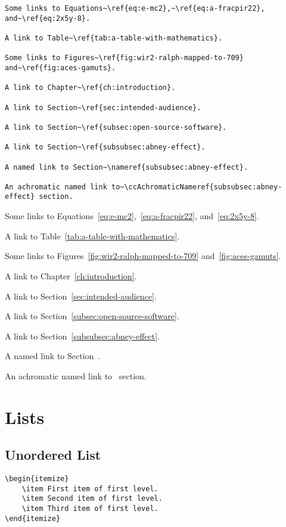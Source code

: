 \begin{lstlisting}[caption={Hyperlinks.}]
Some links to Equations~\ref{eq:e-mc2},~\ref{eq:a-fracpir22}, and~\ref{eq:2x5y-8}.

A link to Table~\ref{tab:a-table-with-mathematics}.

Some links to Figures~\ref{fig:wir2-ralph-mapped-to-709} and~\ref{fig:aces-gamuts}.

A link to Chapter~\ref{ch:introduction}.

A link to Section~\ref{sec:intended-audience}.

A link to Section~\ref{subsec:open-source-software}.

A link to Section~\ref{subsubsec:abney-effect}.

A named link to Section~\nameref{subsubsec:abney-effect}.

An achromatic named link to~\ccAchromaticNameref{subsubsec:abney-effect} section.
\end{lstlisting}

Some links to Equations~\ref{eq:e-mc2},~\ref{eq:a-fracpir22}, and~\ref{eq:2x5y-8}.

A link to Table~\ref{tab:a-table-with-mathematics}.

Some links to Figures~\ref{fig:wir2-ralph-mapped-to-709} and~\ref{fig:aces-gamuts}.

A link to Chapter~\ref{ch:introduction}.

A link to Section~\ref{sec:intended-audience}.

A link to Section~\ref{subsec:open-source-software}.

A link to Section~\ref{subsubsec:abney-effect}.

A named link to Section~.

An achromatic named link to~ section.

\section*{Lists}%
\label{sec:lists}

\subsection*{Unordered List}%
\label{subsec:unordered-list}

\begin{lstlisting}[caption={An unordered list.}]
\begin{itemize}
    \item First item of first level.
    \item Second item of first level.
    \item Third item of first level.
\end{itemize}
\end{lstlisting}

